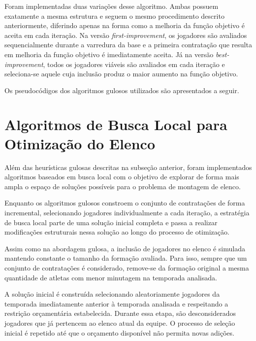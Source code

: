 Foram implementadas duas variações desse algoritmo. Ambas possuem exatamente a mesma estrutura e seguem o mesmo procedimento descrito anteriormente, 
diferindo apenas na forma como a melhoria da função objetivo é aceita em cada iteração. Na versão \textit{first-improvement}, os jogadores são avaliados 
sequencialmente durante a varredura da base e a primeira contratação que resulta em melhoria da função objetivo é imediatamente aceita. 
Já na versão \textit{best-improvement}, todos os jogadores viáveis são avaliados em cada iteração e seleciona-se aquele cuja inclusão 
produz o maior aumento na função objetivo.

Os pseudocódigos dos algoritmos gulosos utilizados são apresentados a seguir.



\FloatBarrier

\section{Algoritmos de Busca Local para Otimização do Elenco}

Além das heurísticas gulosas descritas na subseção anterior, foram implementados algoritmos baseados em busca local com o objetivo de explorar de 
forma mais ampla o espaço de soluções possíveis para o problema de montagem de elenco.

Enquanto os algoritmos gulosos constroem o conjunto de contratações de forma incremental, selecionando jogadores individualmente a cada iteração, 
a estratégia de busca local parte de uma solução inicial completa e passa a realizar modificações estruturais nessa solução ao longo do processo de otimização.

Assim como na abordagem gulosa, a inclusão de jogadores no elenco é simulada mantendo constante o tamanho da formação avaliada. Para isso, 
sempre que um conjunto de contratações é considerado, remove-se da formação original a mesma quantidade de atletas com menor minutagem na temporada analisada.

A solução inicial é construída selecionando aleatoriamente jogadores da temporada imediatamente anterior à temporada analisada e respeitando a restrição 
orçamentária estabelecida. Durante essa etapa, são desconsiderados jogadores que já pertencem ao elenco atual da equipe. O processo de seleção inicial 
é repetido até que o orçamento disponível não permita novas adições.

